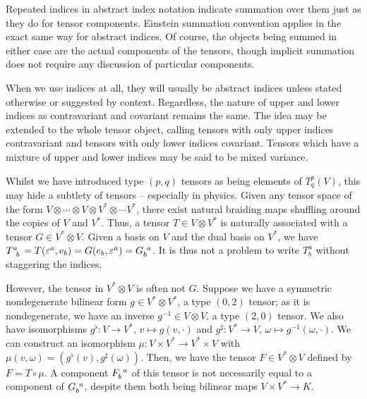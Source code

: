 \documentclass[a4paper,12pt]{article}
\begin{document}
Repeated indices in abstract index notation indicate summation over them just as they do for tensor components.
Einstein summation convention applies in the exact same way for abstract indices.
Of course, the objects being summed in either case are the actual components of the tensors, though implicit summation does not require any discussion of particular components.

When we use indices at all, they will usually be abstract indices unless stated otherwise or suggested by context.
Regardless, the nature of upper and lower indices as contravariant and covariant remains the same.
The idea may be extended to the whole tensor object, calling tensors with only upper indices contravariant and tensors with only lower indices covariant.
Tensors which have a mixture of upper and lower indices may be said to be mixed variance.

Whilst we have introduced type $(p, q)$ tensors as being elements of $T^p_q(V)$, this may hide a subtlety of tensors -- especially in physics.
Given any tensor space of the form $V \otimes \cdots \otimes V \otimes V^* \otimes \cdots V^*$, there exist natural braiding maps shuffling around the copies of $V$ and $V^*$.
Thus, a tensor $T \in V \otimes V^*$ is naturally associated with a tensor $G \in V^* \otimes V$.
Given a basis on $V$ and the dual basis on $V^*$, we have $\tensor{T}{^a_b} = T(\varepsilon^a, e_b) = G(e_b, \varepsilon^a) = \tensor{G}{_b^a}$.
It is thus not a problem to write $T^a_b$ without staggering the indices.

However, the tensor in $V^* \otimes V$ is often not $G$.
Suppose we have a symmetric nondegenerate bilinear form $g \in V^* \otimes V^*$, a type $(0, 2)$ tensor; as it is nondegenerate, we have an inverse $g^{-1} \in V \otimes V$, a type $(2, 0)$ tensor.
We also have isomorphisms $g^\flat \colon V \to V^*$, $v \mapsto g(v, \cdot)$ and $g^\sharp \colon V^* \to V$, $\omega \mapsto g^{-1}(\omega, \cdot)$.
We can construct an isomorphism $\mu \colon V \times V^* \to V^* \times V$ with $\mu(v, \omega) = (g^\flat(v), g^\sharp(\omega))$.
Then, we have the tensor $F \in V^* \otimes V$ defined by $F = T \circ \mu$.
A component $\tensor{F}{_b^a}$ of this tensor is not necessarily equal to a component of $\tensor{G}{_b^a}$, despite them both being bilinear maps $V \times V^* \to K$.
\end{document}
